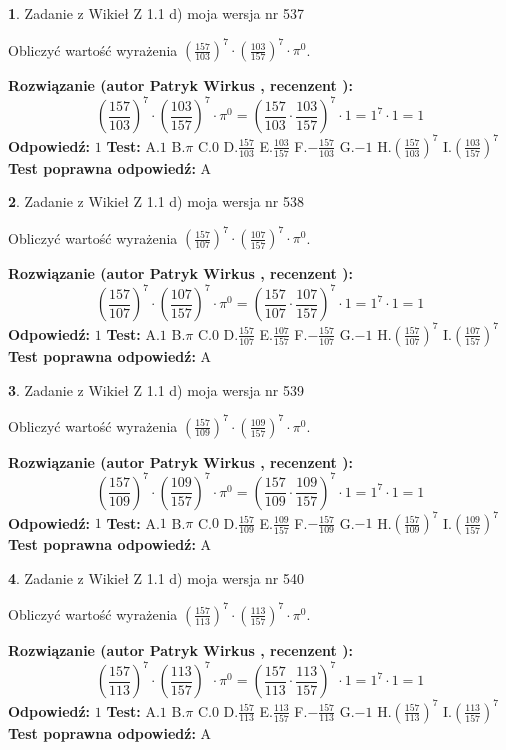 \documentclass[12pt, a4paper]{article}
\theoremstyle{definition} %
\newtheorem{zad}{}
\newcommand{\zadStart}[1]{\begin{zad}#1\newline}
\newcommand{\zadStop}{\end{zad}}
\newcommand{\rozwStart}[2]{\noindent \textbf{Rozwiązanie (autor #1 , recenzent #2): }\newline}
\newcommand{\rozwStop}{\newline}
\newcommand{\odpStart}{\noindent \textbf{Odpowiedź:}\newline}
\newcommand{\odpStop}{\newline}
\newcommand{\testStart}{\noindent \textbf{Test:}\newline}
\newcommand{\testStop}{\newline}
\newcommand{\kluczStart}{\noindent \textbf{Test poprawna odpowiedź:}\newline}
\newcommand{\kluczStop}{\newline}
\begin{document}
\zadStart{Zadanie z Wikieł Z 1.1 d) moja wersja nr 537}

Obliczyć wartość wyrażenia $(\frac{157}{103})^{7} \cdot (\frac{103}{157})^{7} \cdot \pi^{0}$.
\zadStop
\rozwStart{Patryk Wirkus}{}
$$(\frac{157}{103})^{7} \cdot (\frac{103}{157})^{7} \cdot \pi^{0} = (\frac{157}{103} \cdot \frac{103}{157})^{7} \cdot 1 = 1^{7} \cdot 1 = 1$$
\rozwStop
\odpStart
$1$
\odpStop
\testStart
A.$1$ B.$\pi$ C.$0$ D.$\frac{157}{103}$ E.$\frac{103}{157}$
F.$-\frac{157}{103}$ G.$-1$
H.$(\frac{157}{103})^{7}$
I.$(\frac{103}{157})^{7}$
\testStop
\kluczStart
A
\kluczStop



\zadStart{Zadanie z Wikieł Z 1.1 d) moja wersja nr 538}

Obliczyć wartość wyrażenia $(\frac{157}{107})^{7} \cdot (\frac{107}{157})^{7} \cdot \pi^{0}$.
\zadStop
\rozwStart{Patryk Wirkus}{}
$$(\frac{157}{107})^{7} \cdot (\frac{107}{157})^{7} \cdot \pi^{0} = (\frac{157}{107} \cdot \frac{107}{157})^{7} \cdot 1 = 1^{7} \cdot 1 = 1$$
\rozwStop
\odpStart
$1$
\odpStop
\testStart
A.$1$ B.$\pi$ C.$0$ D.$\frac{157}{107}$ E.$\frac{107}{157}$
F.$-\frac{157}{107}$ G.$-1$
H.$(\frac{157}{107})^{7}$
I.$(\frac{107}{157})^{7}$
\testStop
\kluczStart
A
\kluczStop



\zadStart{Zadanie z Wikieł Z 1.1 d) moja wersja nr 539}

Obliczyć wartość wyrażenia $(\frac{157}{109})^{7} \cdot (\frac{109}{157})^{7} \cdot \pi^{0}$.
\zadStop
\rozwStart{Patryk Wirkus}{}
$$(\frac{157}{109})^{7} \cdot (\frac{109}{157})^{7} \cdot \pi^{0} = (\frac{157}{109} \cdot \frac{109}{157})^{7} \cdot 1 = 1^{7} \cdot 1 = 1$$
\rozwStop
\odpStart
$1$
\odpStop
\testStart
A.$1$ B.$\pi$ C.$0$ D.$\frac{157}{109}$ E.$\frac{109}{157}$
F.$-\frac{157}{109}$ G.$-1$
H.$(\frac{157}{109})^{7}$
I.$(\frac{109}{157})^{7}$
\testStop
\kluczStart
A
\kluczStop



\zadStart{Zadanie z Wikieł Z 1.1 d) moja wersja nr 540}

Obliczyć wartość wyrażenia $(\frac{157}{113})^{7} \cdot (\frac{113}{157})^{7} \cdot \pi^{0}$.
\zadStop
\rozwStart{Patryk Wirkus}{}
$$(\frac{157}{113})^{7} \cdot (\frac{113}{157})^{7} \cdot \pi^{0} = (\frac{157}{113} \cdot \frac{113}{157})^{7} \cdot 1 = 1^{7} \cdot 1 = 1$$
\rozwStop
\odpStart
$1$
\odpStop
\testStart
A.$1$ B.$\pi$ C.$0$ D.$\frac{157}{113}$ E.$\frac{113}{157}$
F.$-\frac{157}{113}$ G.$-1$
H.$(\frac{157}{113})^{7}$
I.$(\frac{113}{157})^{7}$
\testStop
\kluczStart
A
\kluczStop
\end{document}
